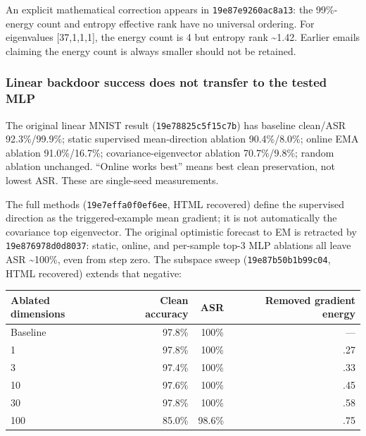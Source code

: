 \documentclass[
  british,
  10pt,
  a4paper,
]{article}
\newcounter{none} %
\begin{document}
An explicit mathematical correction appears in
\texttt{19e87e9260ac\allowbreak{}8a13}: the 99\%-energy count and
entropy effective rank have no universal ordering. For eigenvalues
[37,\allowbreak{}1,\allowbreak{}1,\allowbreak{}1],\allowbreak{} the
energy count is 4 but entropy rank \textasciitilde1.42. Earlier emails
claiming the energy count is always smaller should not be retained.

\subsubsection{Linear backdoor success does not transfer to the tested
MLP}\label{email-evidence--linear-backdoor-success-does-not-transfer-to-the-tested-mlp}

The original linear MNIST result
(\texttt{19e78825c5f1\allowbreak{}5c7b}) has baseline clean/ASR
92.\allowbreak{}3\%/\allowbreak{}99.\allowbreak{}9\%; static supervised
mean-\allowbreak{}direction ablation
90.\allowbreak{}4\%/\allowbreak{}8.\allowbreak{}0\%; online EMA ablation
91.\allowbreak{}0\%/\allowbreak{}16.\allowbreak{}7\%;
covariance-\allowbreak{}eigenvector ablation
70.\allowbreak{}7\%/\allowbreak{}9.\allowbreak{}8\%; random ablation
unchanged. ``Online works best'' means best clean
preservation\allowbreak{},\allowbreak{} not lowest ASR. These are
single-\allowbreak{}seed measurements\allowbreak{}.\allowbreak{}

The full methods (\texttt{19e7effa0f0e\allowbreak{}f6ee}, HTML
recovered) define the supervised direction as the
triggered-\allowbreak{}example mean gradient; it is not automatically
the covariance top eigenvector.\allowbreak{} The original optimistic
forecast to EM is retracted by \texttt{19e876978d0d\allowbreak{}8037}:
static, online, and per-sample top-3 MLP ablations all leave ASR
\textasciitilde100\%, even from step zero. The subspace sweep
(\texttt{19e87b50b1b9\allowbreak{}9c04}, HTML recovered) extends that
negative:

{\def\LTcaptype{none} %
\begin{longtable}[]{@{}lrrr@{}}
\toprule\noalign{}
Ablated dimensions & Clean accuracy & ASR & Removed gradient energy \\
\midrule\noalign{}
\endhead
\bottomrule\noalign{}
\endlastfoot
Baseline & 97.8\% & 100\% & --- \\
1 & 97.8\% & 100\% & .27 \\
3 & 97.4\% & 100\% & .33 \\
10 & 97.6\% & 100\% & .45 \\
30 & 97.8\% & 100\% & .58 \\
100 & 85.0\% & 98.6\% & .75 \\
\end{longtable}
}
\end{document}
